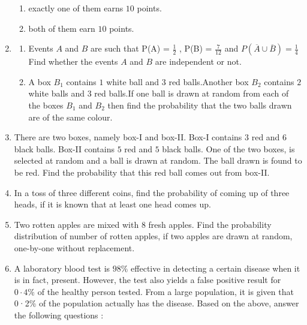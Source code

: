\begin{enumerate}[label=\thesection.\arabic*.,ref=\thesection.\theenumi]
\begin{enumerate}[label=(\alph*)]
    
 \item  exactly one of them earns $10$ points.
 
 \item  both of them earn $10$ points.

\end{enumerate}


\item 
\begin{enumerate}[label=(\alph*)]
    
 \item  Events $A$ and $B$ are such that
 P(A) =  $\frac{1}{2}$ , P(B) =  $\frac{7}{12}$  and $ P( \overline{A}  \cup  \overline{B} )= \frac{1}{4}$ Find whether the events $A$ and $B$ are independent or not.
 
 \item  A box $B_{1}$ contains $1$ white ball and $3$ red balls.Another box $B_{2}$ contains $2$ white balls and $3$ red balls.If one ball is drawn at random from each of the boxes $B_{1}$ and $B_{2}$ then find the probability that the two balls drawn are of the same colour.
 
\end{enumerate}

 \item There are two boxes, namely box-I and box-II. Box-I contains $3$ red and $6$ black balls. Box-II contains $5$ red and $5$ black balls. One of the two boxes, is selected at random and a ball is drawn at random. The ball drawn is found to be red. Find the probability that this red ball comes out from box-II.

\item In a toss of three different coins, find the probability of coming up of three heads, if it is known that at least one head comes up.

\item Two rotten apples are mixed with $8$ fresh apples. Find the probability distribution of number of rotten apples, if two apples are drawn at random, one-by-one without replacement.

\item A laboratory blood test is $98\%$ effective in detecting a certain 
disease when it is in fact, present. However, the test also yields 
a false positive result for $0·4\%$ of the healthy person tested. 
From a large population, it is given that 0·2$\%$ of the population 
actually has the disease. 
Based on the above, answer the following questions : 


\end{enumerate}
